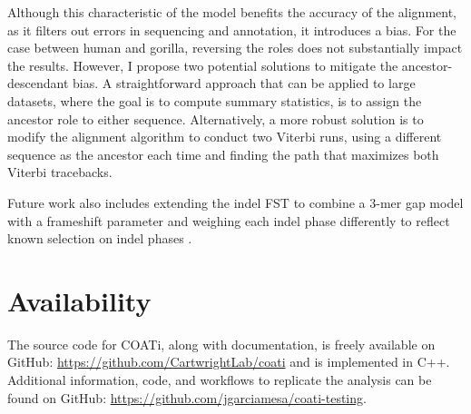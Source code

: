 Although this characteristic of the model benefits the accuracy of the alignment, as it filters out errors in sequencing and annotation, it introduces a bias. For the case between human and gorilla, reversing the roles does not substantially impact the results. However, I propose two potential solutions to mitigate the ancestor-descendant bias. A straightforward approach that can be applied to large datasets, where the goal is to compute summary statistics, is to assign the ancestor role to either sequence. Alternatively, a more robust solution is to modify the alignment algorithm to conduct two Viterbi runs, using a different sequence as the ancestor each time and finding the path that maximizes both Viterbi tracebacks.

Future work also includes extending the indel FST to combine a 3-mer gap model with a frameshift parameter and weighing each indel phase differently to reflect known selection on indel phases \citep{zhu2022profiling}.

\section{Availability}
The source code for COATi, along with documentation, is freely available on GitHub: \url{https://github.com/CartwrightLab/coati} and is implemented in C++. Additional information, code, and workflows to replicate the analysis can be found on GitHub: \url{https://github.com/jgarciamesa/coati-testing}.




% 
